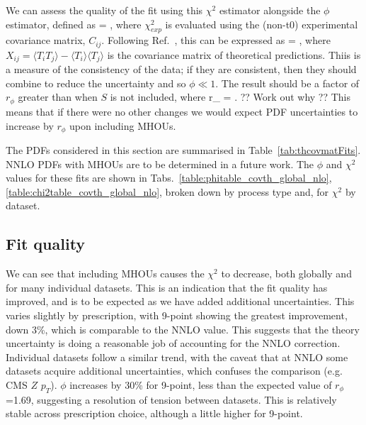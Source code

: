 We can assess the quality of the fit using this $\chi^2$ estimator alongside the $\phi$ estimator, defined as
\be 
\phi = ,
\ee
where $\chi^2_{exp}$ is evaluated using the (non-t0) experimental covariance matrix, $C_{ij}$. Following Ref.~\cite{Ball:2014uwa}, this can be expressed as
\be 
\phi = ,
\ee
where $X_{ij} = \langle T_i T_j \rangle - \langle T_i \rangle \langle T_j \rangle$ is the covariance matrix of theoretical predictions. Thiis is a measure of the consistency of the data; if they are consistent, then they should combine to reduce the uncertainty and so $\phi \ll 1$. The result should be a factor of $r_{\phi}$ greater than when $S$ is not included, where
\be
r_{\phi} = .
\ee
?? Work out why ??
This means that if there were no other changes we would expect PDF uncertainties to increase by $r_{\phi}$ upon including MHOUs. 
  
  
  

The PDFs considered in this section are summarised in Table~\ref{tab:thcovmatFits}. NNLO PDFs with MHOUs are to
be determined in a future work. The $\phi$ and $\chi^2$ values
for these fits are shown in Tabs.~\ref{table:phitable_covth_global_nlo}, \ref{table:chi2table_covth_global_nlo}, broken down by process type and, for $\chi^2$ by dataset.

\subsection{Fit quality}
We can see that including MHOUs causes the $\chi^2$ to decrease, both globally and for many individual datasets. This is an indication that the fit quality has improved, and is to be expected as we have added additional uncertainties. This varies slightly by prescription, with 9-point showing the greatest improvement, down 3\%, which is comparable to the NNLO value. This suggests that the theory uncertainty is doing a reasonable job of accounting for the NNLO correction. Individual datasets follow a similar trend, with the caveat that at NNLO some datasets acquire additional uncertainties, which confuses the comparison (e.g. CMS $Z$ $p_{T}$). $\phi$ increases by 30\% for 9-point, less than the expected value of $r_\phi$=1.69, suggesting a resolution of tension between datasets. This is relatively stable across prescription choice, although a little higher for 9-point. 

